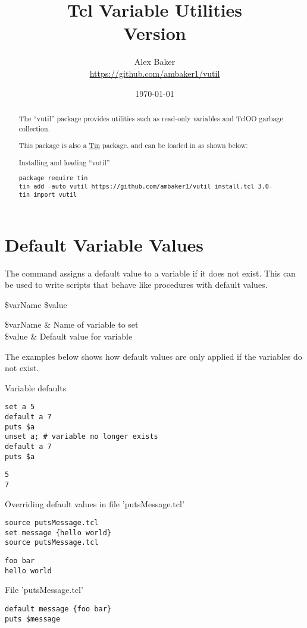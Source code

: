 \documentclass{article}
\title{\Huge Tcl Variable Utilities\\\small Version \version}
\author{Alex Baker\\\small\url{https://github.com/ambaker1/vutil}}
\date{\small\today}
\begin{document}
\maketitle
\begin{abstract}
\begin{center}
The ``vutil'' package provides utilities such as read-only variables and TclOO garbage collection.

This package is also a \textcolor{blue}{\href{https://github.com/ambaker1/Tin}{Tin}} package, and can be loaded in as shown below:
\end{center}
\begin{example}{Installing and loading ``vutil''}
\begin{lstlisting}
package require tin
tin add -auto vutil https://github.com/ambaker1/vutil install.tcl 3.0-
tin import vutil
\end{lstlisting}
\end{example}
\end{abstract}

\clearpage
\section{Default Variable Values}
The command  assigns a default value to a variable if it does not exist.
This can be used to write scripts that behave like procedures with default values.
\begin{syntax}
 \$varName \$value
\end{syntax}
\begin{args}
\$varName & Name of variable to set \\
\$value & Default value for variable
\end{args}

The examples below shows how default values are only applied if the variables do not exist.
\begin{example}{Variable defaults}
\begin{lstlisting}
set a 5
default a 7
puts $a
unset a; # variable no longer exists
default a 7
puts $a
\end{lstlisting}
\tcblower
\begin{lstlisting}
5
7
\end{lstlisting}
\end{example}
\begin{example}{Overriding default values in file 'putsMessage.tcl'}
\begin{lstlisting}
source putsMessage.tcl
set message {hello world}
source putsMessage.tcl
\end{lstlisting}
\tcblower
\begin{lstlisting}
foo bar
hello world
\end{lstlisting}
\end{example}
\begin{example}{File 'putsMessage.tcl'}
\begin{lstlisting}
default message {foo bar}
puts $message
\end{lstlisting}
\end{example}
\end{document}
